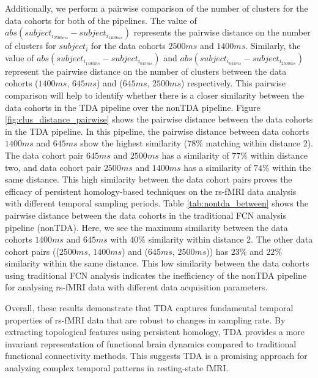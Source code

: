 Additionally, we perform a pairwise comparison of the number of clusters for the data cohorts for both of the pipelines. The value of $abs(subject_{i_{2500ms}} - subject_{i_{1400ms}})$ represents the pairwise distance on the number of clusters for $subject_i$ for the data cohorts $2500ms$ and $1400ms$. Similarly, the value of $abs(subject_{i_{1400ms}} - subject_{i_{645ms}})$ and $abs(subject_{i_{645ms}} - subject_{i_{2500ms}})$ represent the pairwise distance on the number of clusters between the data cohorts ($1400ms$, $645ms$) and ($645ms$, $2500ms$) respectively. This pairwise comparison will help to identify whether there is a closer similarity between the data cohorts in the TDA pipeline over the nonTDA pipeline. Figure \ref{fig:clus_distance_pairwise} shows the pairwise distance between the data cohorts in the TDA pipeline. In this pipeline, the pairwise distance between data cohorts $1400ms$ and $645ms$ show the highest similarity ($78\%$ matching within distance 2). The data cohort pair $645ms$ and $2500ms$ has a similarity of $77\%$ within distance two, and data cohort pair $2500ms$ and $1400ms$ has a similarity of $74\%$ within the same distance. This high similarity between the data cohort pairs proves the efficacy of persistent homology-based techniques on the rs-fMRI data analysis with different temporal sampling periods. Table \ref{tab:nontda_between} shows the pairwise distance between the data cohorts in the traditional FCN analysis pipeline (nonTDA). Here, we see the maximum similarity between the data cohorts $1400ms$ and $645ms$ with $40\%$ similarity within distance 2. The other data cohort pairs (($2500ms$, $1400ms$) and ($645ms$, $2500ms$)) has $23\%$ and $22\%$ similarity within the same distance. This low similarity between the data cohorts using traditional FCN analysis indicates the inefficiency of the nonTDA pipeline for analysing rs-fMRI data with different data acquisition parameters. 


Overall, these results demonstrate that TDA captures fundamental temporal properties of rs-fMRI data that are robust to changes in sampling rate. By extracting topological features using persistent homology, TDA provides a more invariant representation of functional brain dynamics compared to traditional functional connectivity methods. This suggests TDA is a promising approach for analyzing complex temporal patterns in resting-state fMRI.




